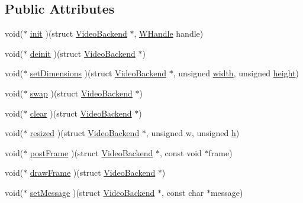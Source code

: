 \subsection*{Public Attributes}
\begin{DoxyCompactItemize}
\item 
void($\ast$ \mbox{\hyperlink{struct_video_backend_ad5f40e7cdcac734dba03d4686538871e}{init}} )(struct \mbox{\hyperlink{struct_video_backend}{Video\+Backend}} $\ast$, \mbox{\hyperlink{video-backend_8h_aaa69bc83f36b455578d1f29b125741d9}{W\+Handle}} handle)
\item 
void($\ast$ \mbox{\hyperlink{struct_video_backend_a0f210969342b9b51cb60f58ef0e7fecb}{deinit}} )(struct \mbox{\hyperlink{struct_video_backend}{Video\+Backend}} $\ast$)
\item 
void($\ast$ \mbox{\hyperlink{struct_video_backend_adc237c2c1d9ee05e0db9af4bc7fdfb9f}{set\+Dimensions}} )(struct \mbox{\hyperlink{struct_video_backend}{Video\+Backend}} $\ast$, unsigned \mbox{\hyperlink{struct_video_backend_a462affa3c14c45e8b0dae4c5f8dfa205}{width}}, unsigned \mbox{\hyperlink{struct_video_backend_a163ee12ec8ae96107bca8e4f95f783eb}{height}})
\item 
void($\ast$ \mbox{\hyperlink{struct_video_backend_a95e980321b06846b3bfa1220e19bd913}{swap}} )(struct \mbox{\hyperlink{struct_video_backend}{Video\+Backend}} $\ast$)
\item 
void($\ast$ \mbox{\hyperlink{struct_video_backend_a57a12d9a062df2b35b06e8d3f4be31b0}{clear}} )(struct \mbox{\hyperlink{struct_video_backend}{Video\+Backend}} $\ast$)
\item 
void($\ast$ \mbox{\hyperlink{struct_video_backend_af5a54ad07696f911edeb912994994938}{resized}} )(struct \mbox{\hyperlink{struct_video_backend}{Video\+Backend}} $\ast$, unsigned w, unsigned \mbox{\hyperlink{isa-lr35902_8c_a06a62682361411df32cf88f75a0b8da4}{h}})
\item 
void($\ast$ \mbox{\hyperlink{struct_video_backend_a59a0ef3e8be90142a3382107dfa72c66}{post\+Frame}} )(struct \mbox{\hyperlink{struct_video_backend}{Video\+Backend}} $\ast$, const void $\ast$frame)
\item 
void($\ast$ \mbox{\hyperlink{struct_video_backend_ab77235aca3ec99218b218c7cc95d0da2}{draw\+Frame}} )(struct \mbox{\hyperlink{struct_video_backend}{Video\+Backend}} $\ast$)
\item 
void($\ast$ \mbox{\hyperlink{struct_video_backend_a0c72a2ee942fed4012f63b661bec56dd}{set\+Message}} )(struct \mbox{\hyperlink{struct_video_backend}{Video\+Backend}} $\ast$, const char $\ast$message)

\end{DoxyCompactItemize}
